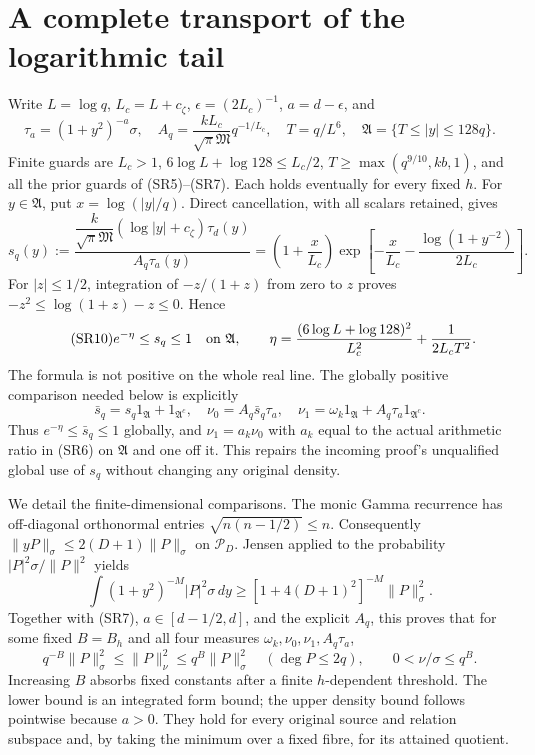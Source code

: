 \documentclass[11pt]{article}
\newcommand{\PP}{\mathcal P}\newcommand{\BB}{\mathcal B}
\newcommand{\dd}{\,d}\newcommand{\Tr}{\operatorname{Tr}}
\begin{document}
\section{A complete transport of the logarithmic tail}
Write $L=\log q$, $L_c=L+c_\zeta$, $\epsilon=(2L_c)^{-1}$,
$a=d-\epsilon$, and
\begin{equation}\tag{SR8}
 \tau_a=(1+y^2)^{-a}\sigma,\quad
 A_q=\frac{kL_c}{\sqrt\pi\mathfrak M}q^{-1/L_c},\quad
 T=q/L^6,\quad \mathfrak A=\{T\le |y|\le128q\}.
\end{equation}
Finite guards are $L_c>1$, $6\log L+\log128\le L_c/2$,
$T\ge\max(q^{9/10},kb,1)$, and all the prior guards of (SR5)--(SR7).
Each holds eventually for every fixed $h$. For $y\in\mathfrak A$, put
$x=\log(|y|/q)$. Direct cancellation, with all scalars retained, gives
\begin{equation}\tag{SR9}
 s_q(y):=\frac{\dfrac{k}{\sqrt\pi\mathfrak M}
 (\log|y|+c_\zeta)\tau_d(y)}{A_q\tau_a(y)}
 =\left(1+\frac{x}{L_c}\right)
 \exp\left[-\frac{x}{L_c}
 -\frac{\log(1+y^{-2})}{2L_c}\right].
\end{equation}
For $|z|\le1/2$, integration of $-z/(1+z)$ from zero to $z$ proves
$-z^2\le\log(1+z)-z\le0$. Hence
\begin{equation}\tag{SR10}
 e^{-\eta}\le s_q\le1\quad\hbox{on }\mathfrak A,
 \qquad \eta=\frac{(6\log L+\log128)^2}{L_c^2}
                   +\frac1{2L_cT^2}.
\end{equation}
The formula is not positive on the whole real line. The globally positive
comparison needed below is explicitly
\begin{equation}\tag{SR11}
 \bar s_q=s_q1_{\mathfrak A}+1_{\mathfrak A^c},\quad
 \nu_0=A_q\bar s_q\tau_a,\quad
 \nu_1=\omega_k1_{\mathfrak A}+A_q\tau_a1_{\mathfrak A^c}.
\end{equation}
Thus $e^{-\eta}\le\bar s_q\le1$ globally, and
$\nu_1=a_k\nu_0$ with $a_k$ equal to the actual arithmetic ratio in (SR6)
on $\mathfrak A$ and one off it. This repairs the incoming proof's unqualified
global use of $s_q$ without changing any original density.

We detail the finite-dimensional comparisons. The monic Gamma recurrence
has off-diagonal orthonormal entries $\sqrt{n(n-1/2)}\le n$.
Consequently $\|yP\|_\sigma\le2(D+1)\|P\|_\sigma$ on $\PP_D$.
Jensen applied to the probability $|P|^2\sigma/\|P\|^2$ yields
\begin{equation}\tag{SR12}
 \int(1+y^2)^{-M}|P|^2\sigma\dd y
 \ge[1+4(D+1)^2]^{-M}\|P\|_\sigma^2.
\end{equation}
Together with (SR7), $a\in[d-1/2,d]$, and the explicit $A_q$, this proves
that for some fixed $B=B_h$ and all four measures
$\omega_k,\nu_0,\nu_1,A_q\tau_a$,
\begin{equation}\tag{SR13}
 q^{-B}\|P\|_\sigma^2\le\|P\|_\nu^2\le q^B\|P\|_\sigma^2
 \quad(\deg P\le2q),\qquad 0<\nu/\sigma\le q^B.
\end{equation}
Increasing $B$ absorbs fixed constants after a finite $h$-dependent threshold.
The lower bound is an integrated form bound; the upper density bound follows
pointwise because $a>0$. They hold for every original source and relation
subspace and, by taking the minimum over a fixed fibre, for its attained quotient.
\end{document}
